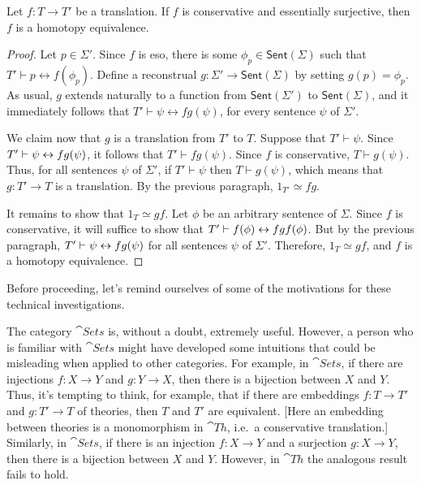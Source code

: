 
\begin{prop} Let $f:T\to T'$ be a translation.  If $f$ is conservative
  and essentially surjective, then $f$ is a homotopy
  equivalence. \end{prop}

\begin{proof} Let $p\in \Sigma '$.  Since $f$ is eso, there is some
  $\phi _p\in\mathsf{Sent}(\Sigma )$ such that $T'\vdash
  p\leftrightarrow f(\phi _p)$.  Define a reconstrual $g:\Sigma '\to
  \mathsf{Sent}(\Sigma )$ by setting $g(p)=\phi _p$.  As usual, $g$
  extends naturally to a function from $\mathsf{Sent}(\Sigma ')$ to
  $\mathsf{Sent}(\Sigma )$, and it immediately follows that $T'\vdash
  \psi \leftrightarrow fg(\psi )$, for every sentence $\psi$ of
  $\Sigma '$.

  We claim now that $g$ is a translation from $T'$ to $T$.  Suppose
  that $T'\vdash \psi$.  Since $T'\vdash \psi\leftrightarrow fg(\psi )$, it
  follows that $T'\vdash fg(\psi )$.  Since $f$ is conservative,
  $T\vdash g(\psi )$.  Thus, for all sentences $\psi$ of $\Sigma '$,
  if $T'\vdash \psi$ then $T\vdash g(\psi )$, which means that
  $g:T'\to T$ is a translation.  By the previous paragraph,
  $1_{T'}\simeq fg$.

  It remains to show that $1_T\simeq gf$.  Let $\phi$ be an arbitrary
  sentence of $\Sigma$.  Since $f$ is conservative, it will suffice to
  show that $T'\vdash f(\phi )\leftrightarrow fgf(\phi )$.  But by the previous
  paragraph, $T'\vdash \psi \leftrightarrow fg(\psi )$ for all sentences $\psi$
  of $\Sigma'$.  Therefore, $1_{T}\simeq gf$, and $f$ is a homotopy
  equivalence.
\end{proof}


Before proceeding, let's remind ourselves of some of the motivations
for these technical investigations.

The category $\cat{Sets}$ is, without a doubt, extremely useful.
However, a person who is familiar with $\cat{Sets}$ might have
developed some intuitions that could be misleading when applied to
other categories.  For example, in $\cat{Sets}$, if there are
injections $f:X\to Y$ and $g:Y\to X$, then there is a bijection
between $X$ and $Y$.  Thus, it's tempting to think, for example, that
if there are embeddings $f:T\to T'$ and $g:T'\to T$ of theories, then
$T$ and $T'$ are equivalent.  [Here an embedding between theories is a
monomorphism in $\cat{Th}$, i.e.\ a conservative translation.]
Similarly, in $\cat{Sets}$, if there is an injection $f:X\to Y$ and a
surjection $g:X\to Y$, then there is a bijection between $X$ and $Y$.
However, in $\cat{Th}$ the analogous result fails to hold.

